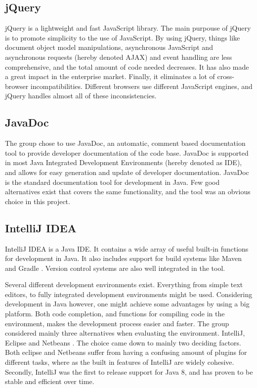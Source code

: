 \subsection{jQuery}
\label{subsec:prestudies-tools-jQuery}

jQuery \cite{jquery} is a lightweight and fast JavaScript library. The main purpouse of jQuery is to promote simplicity to the use of JavaScript. By using jQuery, things like document object model manipulations,  asynchronous JavaScript and asynchronous requests (hereby denoted AJAX) and event handling are less comprehensive, and the total amount of code needed decreases. It has also made a great impact in the enterprise market. Finally, it eliminates a lot of cross-browser incompatibilities. Different browsers use different JavaScript engines, and jQuery handles almost all of these inconsistencies.

\subsection{JavaDoc}
\label{subsec:prestudies-tools-javadoc}

The group chose to use JavaDoc, an automatic, comment based documentation tool to provide developer documentation of the code base. JavaDoc is supported in most Java Integrated Development Environments (hereby denoted as IDE), and allows for easy generation and update of developer documentation. JavaDoc is the standard documentation tool for development in Java. Few good alternatives exist that covers the same functionality, and the tool was an obvious choice in this project.

\subsection{IntelliJ IDEA}
\label{subsec:prestudies-tools-intellij_idea}

IntelliJ IDEA \cite{intellij-idea} is a Java IDE. It contains a wide array of useful built-in functions for development in Java. It also includes support for build systems like Maven \cite{maven} and Gradle \cite{gradle}. Version control systems are also well integrated in the tool.

Several different development environments exist. Everything from simple text editors, to fully integrated development environments might be used. Considering development in Java however, one might achieve some advantages by using a big platform. Both code completion, and functions for compiling code in the environment, makes the development process easier and faster. The group considered mainly three alternatives when evaluating the environment. IntelliJ, Eclipse \cite{eclipse} and Netbeans \cite{netbeans}. The choice came down to mainly two deciding factors. Both eclipse and Netbeans suffer from having a confusing amount of plugins for different tasks, where as the built in features of IntelliJ are widely cohesive. Secondly, IntelliJ was the first to release support for Java 8, and has proven to be stable and efficient over time.

